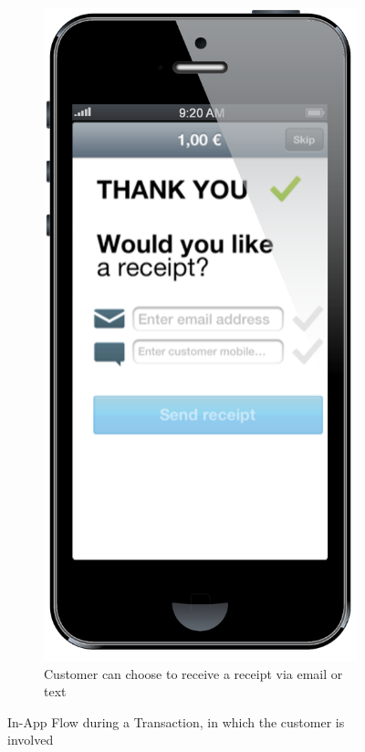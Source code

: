 \documentclass[a4paper, oneside]{csthesis}
\begin{document}
\begin{figure}
\begin{subfigure}[b]{0.22\textwidth}
                \includegraphics[width=\textwidth]{figures/flow6.png}
                \caption{Customer can choose to receive a receipt via email or text}
                \label{fig:flow6}
        \end{subfigure}
        \caption{In-App Flow during a Transaction, in which the customer is involved}\label{fig:flow-customer}
\end{figure}
\end{document}
